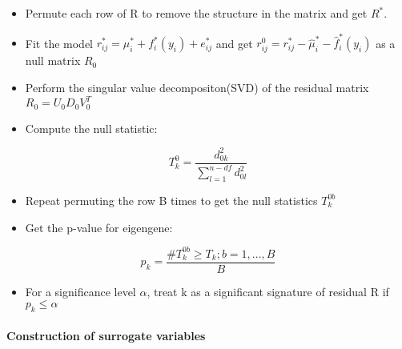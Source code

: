 \documentclass[
]{book}
\providecommand{\tightlist}{%
  \setlength{\itemsep}{0pt}\setlength{\parskip}{0pt}}
\begin{document}
\begin{itemize}
\item
  Permute each row of R to remove the structure in the matrix and get \(R^*\).
\item
  Fit the model \(r_{ij}^* = \mu_i^* + f_i^*(y_i) + e^*_{ij}\) and get \(r_{ij}^0 = r^*_{ij}-\hat\mu^*_i - \hat f^*_i(y_i)\) as a null matrix \(R_0\)
\item
  Perform the singular value decompositon(SVD) of the residual matrix \(R_0 = U_0D_0V_0^T\)
\item
  Compute the null statistic:
\end{itemize}

\[
T_k^0 = \frac{d_{0k}^2}{\sum_{l=1}^{n-df}d_{0l}^2}
\]

\begin{itemize}
\item
  Repeat permuting the row B times to get the null statistics \(T_k^{0b}\)
\item
  Get the p-value for eigengene:
\end{itemize}

\[p_k = \frac{\#{T_k^{0b}\geq T_k;b=1,...,B }}{B}\]

\begin{itemize}
\tightlist
\item
  For a significance level \(\alpha\), treat k as a significant signature of residual R if \(p_k\leq\alpha\)
\end{itemize}

\hypertarget{construction-of-surrogate-variables}{%
\paragraph{Construction of surrogate variables}\label{construction-of-surrogate-variables}}
\end{document}
